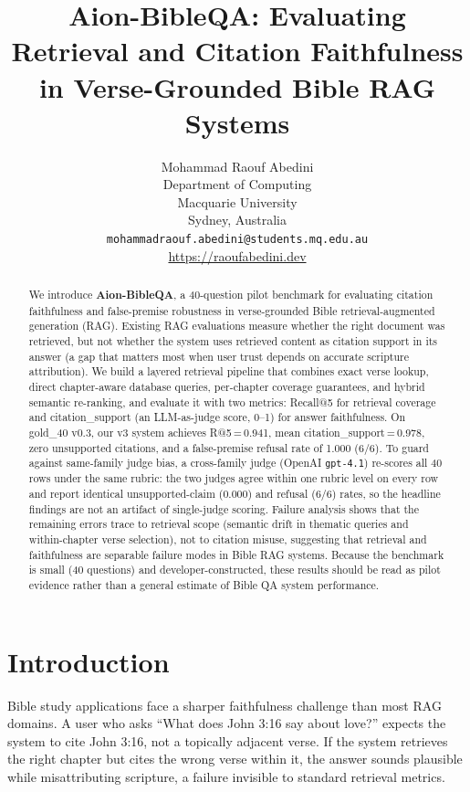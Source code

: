 \documentclass[11pt]{article}
\title{Aion-BibleQA: Evaluating Retrieval and Citation Faithfulness\\
       in Verse-Grounded Bible RAG Systems}
\author{Mohammad Raouf Abedini\\
  Department of Computing\\
  Macquarie University\\
  Sydney, Australia\\
  \texttt{mohammadraouf.abedini@students.mq.edu.au}\\
  \url{https://raoufabedini.dev}}
\begin{document}
\maketitle

\begin{abstract}
We introduce \textbf{Aion-BibleQA}, a 40-question pilot benchmark for evaluating citation faithfulness and false-premise robustness in verse-grounded Bible retrieval-augmented generation (RAG).
Existing RAG evaluations measure whether the right document was retrieved, but not whether the system uses retrieved content as citation support in its answer (a gap that matters most when user trust depends on accurate scripture attribution).
We build a layered retrieval pipeline that combines exact verse lookup, direct chapter-aware database queries, per-chapter coverage guarantees, and hybrid semantic re-ranking, and evaluate it with two metrics: Recall@5 for retrieval coverage and citation\_support (an LLM-as-judge score, 0--1) for answer faithfulness.
On gold\_40 v0.3, our v3 system achieves R@5\,=\,0.941, mean citation\_support\,=\,0.978, zero unsupported citations, and a false-premise refusal rate of 1.000 (6/6).
To guard against same-family judge bias, a cross-family judge (OpenAI \texttt{gpt-4.1}) re-scores all 40 rows under the same rubric: the two judges agree within one rubric level on every row and report identical unsupported-claim (0.000) and refusal (6/6) rates, so the headline findings are not an artifact of single-judge scoring.
Failure analysis shows that the remaining errors trace to retrieval scope (semantic drift in thematic queries and within-chapter verse selection), not to citation misuse, suggesting that retrieval and faithfulness are separable failure modes in Bible RAG systems.
Because the benchmark is small (40 questions) and developer-constructed, these results should be read as pilot evidence rather than a general estimate of Bible QA system performance.
\end{abstract}

\section{Introduction}

Bible study applications face a sharper faithfulness challenge than most RAG domains.
A user who asks ``What does John 3:16 say about love?'' expects the system to cite John 3:16, not a topically adjacent verse.
If the system retrieves the right chapter but cites the wrong verse within it, the answer sounds plausible while misattributing scripture, a failure invisible to standard retrieval metrics.
\end{document}
